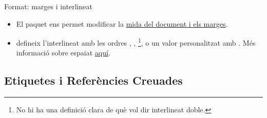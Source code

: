 \begin{frame}[fragile]{Format: marges i interlineat}
\begin{itemize}
\item El paquet  ens permet modificar la \href{https://www.overleaf.com/learn/latex/Page_size_and_margins}{mida del document i els marges}.
\item {} defineix l'interlineat amb les ordres , , \footnote{No hi ha una definició clara de què vol dir interlineat doble.}, o un valor personalitzat amb . Més informació sobre espaiat \href{https://www.overleaf.com/learn/latex/Articles/How_to_change_paragraph_spacing_in_LaTeX#The_setspace_package}{aquí}.
\end{itemize}

\begin{exampletiny}
\usepackage{geometry}
\geometry{
a4paper,
left=30mm,
right=30mm,
top=25mm,
bottom=25mm,
}

\usepackage{setspace}
\end{exampletiny}

\end{frame}

\subsection{Etiquetes i Referències Creuades}

